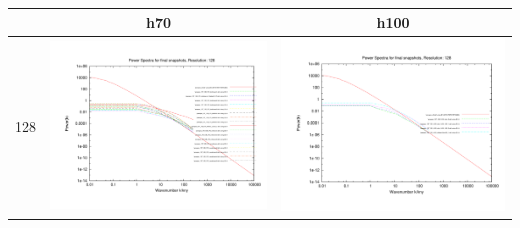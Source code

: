 \begin{itemize}
\begin{table}
\begin{tabular}{l|c|c}
 & h70 & h100 \\
\hline 
 128 & \includegraphics[scale=0.2]{analysis/powerspectra/fin_powspec_combined_128_h70.pdf} & \includegraphics[scale=0.2]{analysis/powerspectra/fin_powspec_combined_128_h100.pdf} \\

\end{tabular}
\end{table}
\end{itemize}
